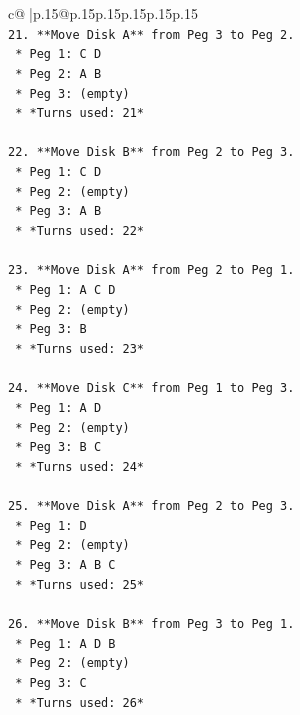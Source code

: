 \documentclass{article}
\begin{document}
{\begin{supertabular}{c@{$\;$}|p{.15\linewidth}@{}p{.15\linewidth}p{.15\linewidth}p{.15\linewidth}p{.15\linewidth}p{.15\linewidth}}
{{{\\ 
\texttt{21. **Move Disk A** from Peg 3 to Peg 2.} \\
\texttt{    *   Peg 1: C D} \\
\texttt{    *   Peg 2: A B} \\
\texttt{    *   Peg 3: (empty)} \\
\texttt{    *   *Turns used: 21*} \\
\\ 
\texttt{22. **Move Disk B** from Peg 2 to Peg 3.} \\
\texttt{    *   Peg 1: C D} \\
\texttt{    *   Peg 2: (empty)} \\
\texttt{    *   Peg 3: A B} \\
\texttt{    *   *Turns used: 22*} \\
\\ 
\texttt{23. **Move Disk A** from Peg 2 to Peg 1.} \\
\texttt{    *   Peg 1: A C D} \\
\texttt{    *   Peg 2: (empty)} \\
\texttt{    *   Peg 3: B} \\
\texttt{    *   *Turns used: 23*} \\
\\ 
\texttt{24. **Move Disk C** from Peg 1 to Peg 3.} \\
\texttt{    *   Peg 1: A D} \\
\texttt{    *   Peg 2: (empty)} \\
\texttt{    *   Peg 3: B C} \\
\texttt{    *   *Turns used: 24*} \\
\\ 
\texttt{25. **Move Disk A** from Peg 2 to Peg 3.} \\
\texttt{    *   Peg 1: D} \\
\texttt{    *   Peg 2: (empty)} \\
\texttt{    *   Peg 3: A B C} \\
\texttt{    *   *Turns used: 25*} \\
\\ 
\texttt{26. **Move Disk B** from Peg 3 to Peg 1.} \\
\texttt{    *   Peg 1: A D B} \\
\texttt{    *   Peg 2: (empty)} \\
\texttt{    *   Peg 3: C} \\
\texttt{    *   *Turns used: 26*} \\
\\ 
}}}
\end{supertabular}}
\end{document}
